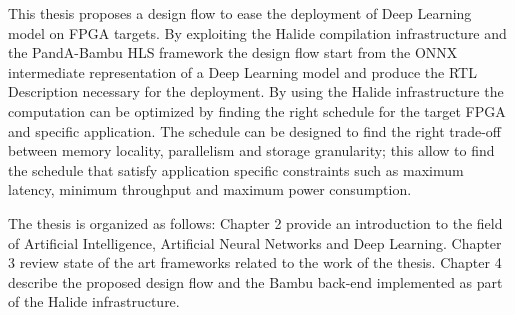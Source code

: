 \documentclass[../main.tex]{subfiles}
\begin{document}
This thesis proposes a design flow to ease the deployment of Deep Learning model on FPGA targets. 
By exploiting the Halide compilation infrastructure and the PandA-Bambu HLS framework the design flow start from the ONNX intermediate representation of a Deep Learning model and produce the RTL Description necessary for the deployment.
By using the Halide infrastructure the computation can be optimized by finding the right schedule for the target FPGA and specific application.
The schedule can be designed to find the right trade-off between memory locality, parallelism and storage granularity; this allow to find the schedule that satisfy application specific constraints such as maximum latency, minimum throughput and maximum power consumption.

The thesis is organized as follows: Chapter 2 provide an introduction to the field of Artificial Intelligence, Artificial Neural Networks and Deep Learning. Chapter 3 review state of the art frameworks related to the work of the thesis. Chapter 4 describe the proposed design flow and the Bambu back-end implemented as part of the Halide infrastructure.
\end{document}
